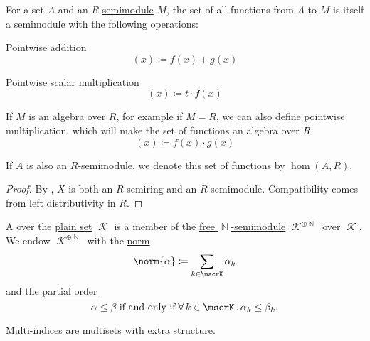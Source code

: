 \begin{proposition}\label{thm:functions_over_semimodule}
  For a set \( A \) and an \( R \)-\hyperref[def:semimodule]{semimodule} \( M \), the set of all functions from \( A \) to \( M \) is itself a semimodule with the following operations:
  \begin{thmenum}
     Pointwise addition
    \begin{equation*}
      [f + g](x) \coloneqq f(x) + g(x)
    \end{equation*}

     Pointwise scalar multiplication
    \begin{equation*}
      [t \cdot f](x) \coloneqq t \cdot f(x)
    \end{equation*}

     If \( M \) is an \hyperref[def:algebra_over_semiring]{algebra} over \( R \), for example if \( M = R \), we can also define pointwise multiplication, which will make the set of functions an algebra over \( R \)
    \begin{equation*}
      [f \cdot g](x) \coloneqq f(x) \cdot g(x)
    \end{equation*}
  \end{thmenum}

  If \( A \) is also an \( R \)-semimodule, we denote this set of functions by \( \hom(A, R) \).
\end{proposition}
\begin{proof}
  By , \( X \) is both an \( R \)-semiring and an \( R \)-semimodule. Compatibility comes from left distributivity in \( R \).
\end{proof}

\begin{definition}\label{def:multi_index}\mimprovised
  A  over the \hyperref[def:set]{plain set} \( \mscrK \) is a member of the \hyperref[def:free_semimodule]{free \( \BbbN \)-semimodule} \( \mscrK^{\oplus \BbbN} \) over \( \mscrK \). We endow \( \mscrK^{\oplus \BbbN} \) with the \hyperref[def:norm]{norm}
  \begin{equation*}
    \norm{ \alpha } \coloneqq \sum_{k \in \mscrK} \alpha_k
  \end{equation*}
  and the \hyperref[def:partially_ordered_set]{partial order}
  \begin{equation*}
    \alpha \leq \beta \T{if and only if} \qforall {k \in \mscrK} \alpha_k \leq \beta_k.
  \end{equation*}

  Multi-indices are \hyperref[def:weighted_set/multiset]{multisets} with extra structure.
\end{definition}

